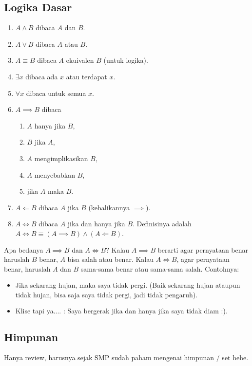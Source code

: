 	\subsection{Logika Dasar}
	\begin{enumerate}
	    \item $A \land B$ dibaca $A$ dan $B$.
	    \item $A \lor B$ dibaca $A$ atau $B$.
	    \item $A \equiv B$ dibaca $A$ ekuivalen $B$ (untuk logika).
	    \item $\exists x$ dibaca ada $x$ atau terdapat $x$.
	    \item $\forall x$ dibaca untuk semua $x$.
	    \item $A \implies B$ dibaca
	    \begin{enumerate}
	        \item $A$ hanya jika $B$,
	        \item $B$ jika $A$,
	        \item $A$ mengimplikasikan $B$,
	        \item $A$ menyebabkan $B$,
	        \item jika $A$ maka $B$.
	    \end{enumerate}
	    \item $A \Longleftarrow B$ dibaca $A$ jika $B$ (kebalikannya $\implies$).
	    \item $A \iff B$ dibaca $A$ jika dan hanya jika $B$. Definisinya adalah $A \iff B \equiv (A \implies B) \land (A \Longleftarrow B)$.
	\end{enumerate}
	Apa bedanya $A \implies B$ dan $A \iff B$? Kalau $A \implies B$ berarti agar pernyataan benar haruslah $B$ benar, $A$ bisa salah atau benar. Kalau $A \iff B$, agar pernyataan benar, haruslah $A$ dan $B$ sama-sama benar atau sama-sama salah. Contohnya:
	\begin{itemize}
	    \item Jika sekarang hujan, maka saya tidak pergi. (Baik sekarang hujan ataupun tidak hujan, bisa saja saya tidak pergi, jadi tidak pengaruh).
	    \item Klise tapi ya.... : Saya bergerak jika dan hanya jika saya tidak diam :).
	\end{itemize}
	\subsection{Himpunan}
	Hanya review, harusnya sejak SMP sudah paham mengenai himpunan / set hehe.
	

